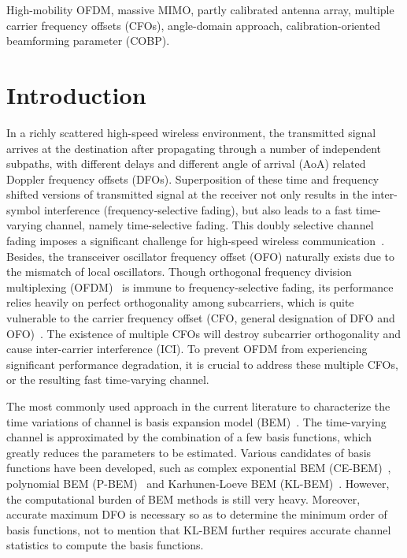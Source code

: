 \documentclass[12pt, draftclsnofoot, onecolumn]{IEEEtran}
\begin{document}
\begin{IEEEkeywords}
High-mobility OFDM, massive MIMO, partly calibrated antenna array, multiple carrier frequency offsets (CFOs), angle-domain approach, calibration-oriented beamforming parameter (COBP).
\end{IEEEkeywords}



\section{Introduction}
In a richly scattered high-speed wireless environment, the transmitted signal arrives at the destination after propagating through a number of independent subpaths, with different delays and different angle of arrival (AoA) related Doppler frequency offsets (DFOs). Superposition of these time and frequency shifted versions of transmitted signal at the receiver not only results in the inter-symbol interference (frequency-selective fading), but also leads to a fast time-varying channel, namely time-selective fading. This doubly selective channel fading imposes a significant challenge for high-speed wireless communication~\cite{J_Wu2016Access, F_Hasegawa2017CSCN}. Besides, the transceiver oscillator frequency offset (OFO) naturally exists due to the mismatch of local oscillators. Though orthogonal frequency division multiplexing (OFDM)~\cite{T_Huang2009TVT} is immune to frequency-selective fading, its performance relies heavily on perfect orthogonality among subcarriers, which is quite vulnerable to the carrier frequency offset (CFO, general designation of DFO and OFO)~\cite{S_Ahmed2005TC}. The existence of multiple CFOs will destroy subcarrier orthogonality and cause inter-carrier interference (ICI).
To prevent OFDM from experiencing significant performance degradation, it is crucial to address these multiple CFOs, or the resulting fast time-varying channel.

The most commonly used approach in the current literature to characterize the time variations of channel is basis expansion model (BEM)~\cite{MF_Rabbi2010IET_C, F_Qu2010TWC, H_Hijazi2009TVT, QT_Zhang2006ICC}. The time-varying channel is approximated by the combination of a few basis functions, which greatly reduces the parameters to be estimated. Various candidates of basis functions have been developed, such as complex exponential BEM (CE-BEM)~\cite{F_Qu2010TWC}, polynomial BEM (P-BEM)~\cite{H_Hijazi2009TVT} and Karhunen-Loeve BEM (KL-BEM)~\cite{QT_Zhang2006ICC}. However, the computational burden of BEM methods is still very heavy. Moreover, accurate maximum DFO is necessary so as to determine the minimum order of basis functions, not to mention that KL-BEM further requires accurate channel statistics to compute the basis functions.
\end{document}
